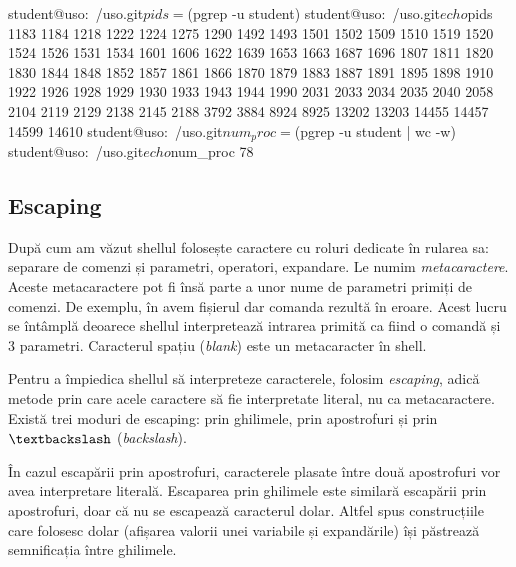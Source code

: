 \begin{screen}[caption={Expandarea comenzilor},label={lst:cli:comm-expansion}]
student@uso:~/uso.git$ pids=$(pgrep -u student)
student@uso:~/uso.git$ echo $pids
1183 1184 1218 1222 1224 1275 1290 1492 1493 1501 1502 1509 1510 1519 1520 1524 1526 1531 1534 1601 1606 1622 1639 1653 1663 1687 1696 1807 1811 1820 1830 1844 1848 1852 1857 1861 1866 1870 1879 1883 1887 1891 1895 1898 1910 1922 1926 1928 1929 1930 1933 1943 1944 1990 2031 2033 2034 2035 2040 2058 2104 2119 2129 2138 2145 2188 3792 3884 8924 8925 13202 13203 14455 14457 14599 14610
student@uso:~/uso.git$ num_proc=$(pgrep -u student | wc -w)
student@uso:~/uso.git$ echo $num_proc
78
\end{screen}

\subsection{Escaping}
\label{sec:cli:shell-func:escaping}

După cum am văzut shellul folosește caractere cu roluri dedicate în rularea sa:
separare de comenzi și parametri, operatori, expandare. Le numim \textit{metacaractere}. Aceste metacaractere pot
fi însă parte a unor nume de parametri primiți de comenzi. De exemplu, în  avem
fișierul  dar comanda rezultă în eroare. Acest lucru se întâmplă deoarece shellul interpretează intrarea primită ca fiind o comandă și 3 parametri. Caracterul spațiu (\textit{blank}) este un metacaracter în shell.


Pentru a împiedica shellul să interpreteze caracterele, folosim \textit{escaping}, adică metode prin care acele caractere să fie interpretate literal, nu ca metacaractere.
Există trei moduri de escaping: prin ghilimele, prin apostrofuri și prin \texttt{$\textbackslash$} (\textit{backslash}).

În cazul escapării prin apostrofuri, caracterele plasate între două apostrofuri
vor avea interpretare literală. Escaparea prin ghilimele este similară escapării
prin apostrofuri, doar că nu se escapează caracterul dolar. Altfel spus
construcțiile care folosesc dolar (afișarea valorii unei variabile și
expandările) își păstrează semnificația între ghilimele.

